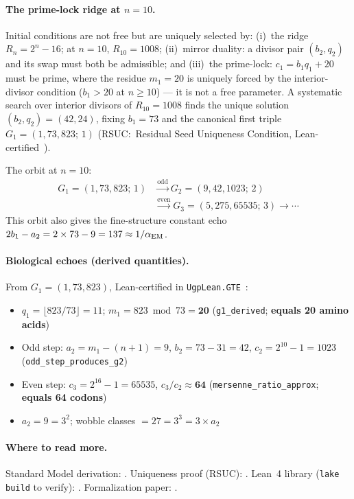 \documentclass[10pt,twocolumn]{article}
\begin{document}
\paragraph{The prime-lock ridge at $n=10$.}
Initial conditions are not free but are uniquely selected by:
(i)~the ridge $R_n = 2^n-16$; at $n{=}10$, $R_{10}=1008$;
(ii)~mirror duality: a divisor pair $(b_2,q_2)$ and its swap must
both be admissible; and
(iii)~the prime-lock: $c_1 = b_1 q_1 + 20$ must be prime, where the
residue $m_1 = 20$ is uniquely forced by the interior-divisor condition
($b_1>20$ at $n\geq10$) --- it is not a free parameter.
A systematic search over interior divisors of $R_{10}=1008$ finds the
unique solution $(b_2,q_2)=(42,24)$, fixing $b_1=73$ and the canonical
first triple $G_1=(1,73,823;\,1)$ (RSUC:\ Residual Seed Uniqueness
Condition, Lean-certified~\cite{ugp-lean,SpivackP24}).

The orbit at $n{=}10$:
\begin{align*}
G_1=(1,73,823;\,1) &\xrightarrow{\text{odd}} G_2=(9,42,1023;\,2) \\
                   &\xrightarrow{\text{even}} G_3=(5,275,65535;\,3)\to\cdots
\end{align*}
This orbit also gives the fine-structure constant echo
$2b_1-a_2=2\times73-9=137\approx1/\alpha_{\rm EM}$.

\paragraph{Biological echoes (derived quantities).}
From $G_1=(1,73,823)$, Lean-certified in \texttt{UgpLean.GTE}~\cite{ugp-lean}:
\begin{itemize}[leftmargin=1.5em,itemsep=0pt]
\item $q_1=\lfloor823/73\rfloor=11$; $m_1=823\bmod73=\mathbf{20}$
  (\texttt{g1\_derived}; \textbf{equals 20 amino acids})
\item Odd step: $a_2=m_1-(n+1)=9$, $b_2=73-31=42$,
  $c_2=2^{10}-1=1023$ (\texttt{odd\_step\_produces\_g2})
\item Even step: $c_3=2^{16}-1=65535$, $c_3/c_2\approx\mathbf{64}$
  (\texttt{mersenne\_ratio\_approx}; \textbf{equals 64 codons})
\item $a_2=9=3^2$; wobble classes $=27=3^3=3\times a_2$
\end{itemize}

\paragraph{Where to read more.}
Standard Model derivation: \cite{SpivackUGP}.
Uniqueness proof (RSUC): \cite{SpivackP24}.
Lean~4 library (\texttt{lake build} to verify): \cite{ugp-lean}.
Formalization paper: \cite{SpivackUGPFormalization}.
\end{document}
